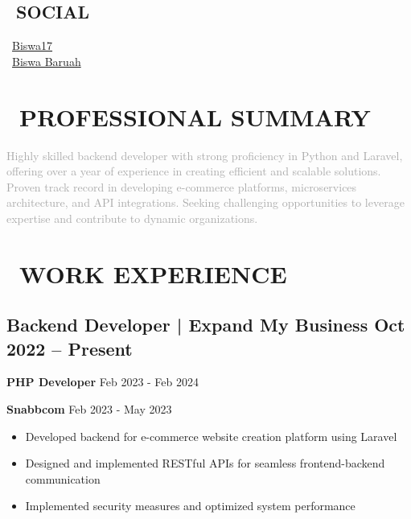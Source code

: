 \documentclass[10pt,a4paper]{article}
\begin{document}
\begin{paracol}{2}
\begin{leftcolumn}
\vspace{2mm}
\section*{\faGlobe\ SOCIAL}
\footnotesize
\textcolor{darkgray}{
\faGithub\ \href{https://github.com/Biswa17}{Biswa17} \\[1mm]
\faLinkedin\ \href{https://linkedin.com/in/biswa-baruah}{Biswa Baruah}
}

\end{leftcolumn}

\begin{rightcolumn}

\section*{\faBriefcase\ PROFESSIONAL SUMMARY}
\small
\textcolor{darkgray}{
Highly skilled backend developer with strong proficiency in Python and Laravel, offering over a year of experience in creating efficient and scalable solutions. Proven track record in developing e-commerce platforms, microservices architecture, and API integrations. Seeking challenging opportunities to leverage expertise and contribute to dynamic organizations.
}

\vspace{2mm}
\section*{\faBuilding\ WORK EXPERIENCE}

\subsection*{Backend Developer | Expand My Business \hfill \textcolor{primaryblue}{Oct 2022 – Present}}

\textbf{\color{darkblue}PHP Developer} \hfill \textcolor{mediumgray}{\small Feb 2023 - Feb 2024}

\textbf{Snabbcom} \hfill \textcolor{mediumgray}{\footnotesize Feb 2023 - May 2023}
\begin{itemize}[leftmargin=10pt]
    \item Developed backend for e-commerce website creation platform using Laravel
    \item Designed and implemented RESTful APIs for seamless frontend-backend communication
    \item Implemented security measures and optimized system performance
\end{itemize}


\end{rightcolumn}
\end{paracol}
\end{document}
